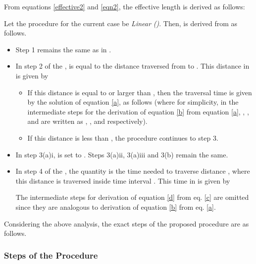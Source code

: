 \documentclass[conference]{IEEEtran}
\begin{document}
From equations \ref{effective2} and \ref{eqn2}, the effective length is derived as follows: 



Let the  procedure for the current case be \emph{Linear  ()}. Then,  is derived from  as follows.

\begin{itemize}
    \item Step 1 remains the same as in .
    \item In step 2 of the ,  is equal to the distance traversed from  to . This distance in  is given by     
    

    \begin{itemize}
        \item If this distance is equal to or larger than , then the traversal time  is given by the solution of equation \ref{a}, as follows (where for simplicity, in the intermediate steps for the derivation of equation \ref{b} from equation \ref{a}, , ,  and  are written as , ,  and  respectively).



        \item If this distance is less than , the procedure continues to step 3.
    \end{itemize}
    \item In step 3(a)i,  is set to . Steps 3(a)ii, 3(a)iii and 3(b) remain the same.
    \item In step 4 of the , the quantity   is the time needed to traverse distance , where this distance is traversed inside time interval . This time in  is given by 



The intermediate steps for derivation of equation \ref{d} from eq. \ref{c} are omitted since they are analogous to derivation of equation \ref{b} from eq. \ref{a}.    
\end{itemize}
    

Considering the above analysis, the exact steps of the proposed  procedure are as follows.

\subsubsection{Steps of the  Procedure}
\end{document}

